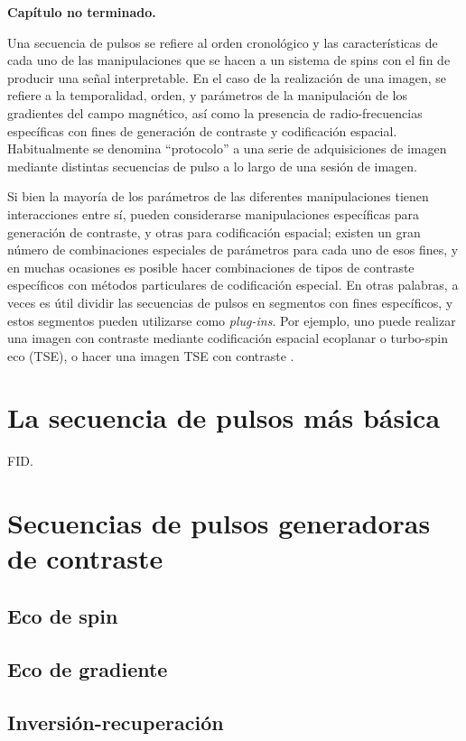 \textbf{Capítulo no terminado.}



Una secuencia de pulsos se refiere al orden cronológico y las características de cada uno de las manipulaciones que se hacen a un sistema de spins con el fin de producir una señal interpretable. En el caso de la realización de una imagen, se refiere a la temporalidad, orden, y parámetros de la manipulación de los gradientes del campo magnético, así como la presencia de radio-frecuencias específicas con fines de generación de contraste y codificación espacial. Habitualmente se denomina ``protocolo'' a una serie de adquisiciones de imagen mediante distintas secuencias de pulso a lo largo de una sesión de imagen.

Si bien la mayoría de los parámetros de las diferentes manipulaciones tienen interacciones entre sí, pueden considerarse manipulaciones específicas para generación de contraste, y otras para codificación espacial; existen un gran número de combinaciones especiales de parámetros para cada uno de esos fines, y en muchas ocasiones es posible hacer combinaciones de tipos de contraste específicos con métodos particulares de codificación especial. En otras palabras, a veces es útil dividir las secuencias de pulsos en segmentos con fines específicos, y estos segmentos pueden utilizarse como \textit{plug-ins}. Por ejemplo, uno puede realizar una imagen con contraste \Ttwo mediante codificación espacial ecoplanar o turbo-spin eco (TSE), o hacer una imagen TSE con contraste \Tone.


\section{La secuencia de pulsos más básica}
FID.

\section{Secuencias de pulsos generadoras de contraste}

\subsection{Eco de spin}


\subsection{Eco de gradiente}

\subsection{Inversión-recuperación}


